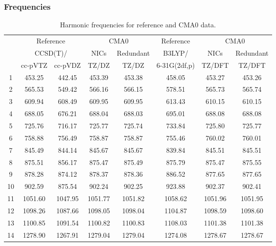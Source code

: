 \documentclass[10pt,oneside]{article}
\begin{document}
\begin{table}[h!]
\subsubsection*{Frequencies}
\centering
\caption{Harmonic frequencies for reference and CMA0 data.}
\begin{tabular}{cccccccc}
\toprule
{} & \multicolumn{2}{c}{Reference} & \multicolumn{2}{c}{CMA0} &    Reference & \multicolumn{2}{c}{CMA0} \\
{} & \multicolumn{2}{c}{CCSD(T)/} &    NICs &  Redundant &       B3LYP/ &    NICs & Redundant \\
{} &   cc-pVTZ & cc-pVDZ &   TZ/DZ &      TZ/DZ & 6-31G(2df,p) &  TZ/DFT &    TZ/DFT \\
\midrule
1  &    453.25 &  442.45 &  453.39 &     453.38 &       458.05 &  453.27 &    453.26 \\
2  &    565.53 &  549.42 &  566.16 &     566.15 &       578.51 &  565.73 &    565.74 \\
3  &    609.94 &  608.49 &  609.95 &     609.95 &       613.43 &  610.15 &    610.15 \\
4  &    688.05 &  676.21 &  688.04 &     688.03 &       695.01 &  688.08 &    688.08 \\
5  &    725.76 &  716.17 &  725.77 &     725.74 &       733.84 &  725.80 &    725.77 \\
6  &    758.88 &  756.49 &  758.87 &     758.87 &       755.46 &  760.02 &    760.01 \\
7  &    845.49 &  844.14 &  845.67 &     845.67 &       839.84 &  845.51 &    845.51 \\
8  &    875.51 &  856.17 &  875.47 &     875.49 &       875.79 &  875.47 &    875.55 \\
9  &    878.28 &  874.12 &  878.37 &     878.36 &       886.52 &  877.65 &    877.65 \\
10 &    902.59 &  875.54 &  902.24 &     902.25 &       923.88 &  902.37 &    902.41 \\
11 &   1051.60 & 1047.95 & 1051.77 &    1051.82 &      1058.62 & 1051.96 &   1051.95 \\
12 &   1098.26 & 1087.66 & 1098.05 &    1098.04 &      1104.87 & 1098.59 &   1098.60 \\
13 &   1100.85 & 1091.54 & 1100.82 &    1100.83 &      1108.03 & 1101.38 &   1101.38 \\
14 &   1278.90 & 1267.91 & 1279.04 &    1279.04 &      1274.08 & 1278.67 &   1278.67 \\

\end{tabular}
\end{table}
\end{document}
